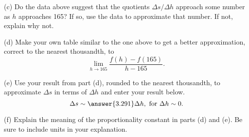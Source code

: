 \documentclass{ximera}
\begin{document}
\begin{question}
(c) Do the data above suggest that the quotients $\Delta s / \Delta h$ approach some number as $h$ approaches 165? If so, use the data to approximate that number. If not, explain why not.

(d) Make your own table similar to the one above to get a better approximation, correct to the nearest thousandth, to
\[
   \lim_{h\to 165} \frac{f(h) - f(165)}{h-165} .
\]


(e) Use your result from part (d), rounded to the nearest thousandth, to approximate $\Delta s$ in terms of $\Delta h$ and enter your result below.
\[
  \Delta s \sim \answer{3.291} \Delta h , \text{ for } \Delta h \sim 0.
\] 

(f) Explain the meaning of the proportionality constant in parts (d) and (e). Be sure to include units in your explanation.


\end{question}
\end{document}
